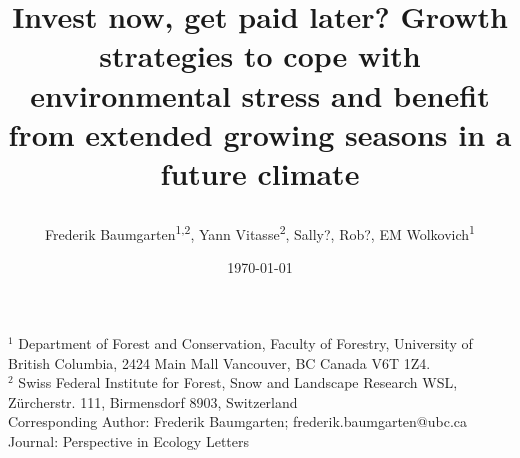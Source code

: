 \documentclass{article}
\begin{document}
	
	
	\title{Invest now, get paid later? Growth strategies to cope with environmental stress and benefit from extended growing seasons in a future climate %
		
		
	} 
	
	\date{\today}
	\author{Frederik Baumgarten\textsuperscript{1,2}, Yann Vitasse\textsuperscript{2}, Sally?, Rob?, EM Wolkovich\textsuperscript{1}}
	\maketitle
	
	$^1$ Department of Forest and Conservation, Faculty of Forestry, University of British Columbia, 2424 Main Mall
	Vancouver, BC Canada V6T 1Z4. \\
	
	$^2$  Swiss Federal Institute for Forest, Snow and Landscape Research WSL, Zürcherstr. 111, Birmensdorf 8903, Switzerland\\
	
	Corresponding Author: Frederik Baumgarten; frederik.baumgarten@ubc.ca \\
	Journal: Perspective in Ecology Letters
	
	
	
	
	
\end{document}
